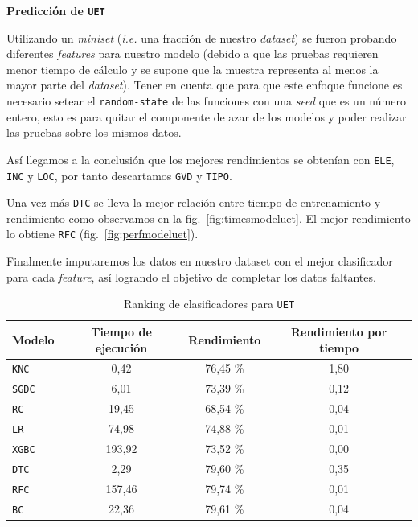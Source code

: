 \documentclass[a4paper,12pt]{article}
\begin{document}
\textbf{Predicción de \texttt{UET}}

Utilizando un \textit{miniset} (\textit{i.e.} una fracción de nuestro \textit{dataset}) se fueron probando diferentes \textit{features} para nuestro modelo (debido a que las pruebas requieren menor tiempo de cálculo y se supone que la muestra representa al menos la mayor parte del \textit{dataset}). Tener en cuenta que para que este enfoque funcione es necesario setear el \texttt{random-state} de las funciones con una \textit{seed} que es un número entero, esto es para quitar el componente de azar de los modelos y poder realizar las pruebas sobre los mismos datos.

Así llegamos a la conclusión que los mejores rendimientos se obtenían con \texttt{ELE}, \texttt{INC} y \texttt{LOC}, por tanto descartamos \texttt{GVD} y \texttt{TIPO}.

Una vez más \texttt{DTC} se lleva la mejor relación entre tiempo de entrenamiento y rendimiento como observamos en la fig.~\ref{fig:timesmodeluet}. El mejor rendimiento lo obtiene \texttt{RFC} (fig.~\ref{fig:perfmodeluet}).

Finalmente imputaremos los datos en nuestro dataset con el mejor clasificador para cada \textit{feature}, así logrando el objetivo de completar los datos faltantes.

\begin{table}[H]
\centering
\begin{tabular}{lccc}
\textbf{Modelo} & \textbf{Tiempo de ejecución} & \textbf{Rendimiento} & \textbf{Rendimiento por tiempo} \\ \hline
\texttt{KNC}  & 0,42   & 76,45 \% & 1,80 \\
\texttt{SGDC} & 6,01   & 73,39 \% & 0,12 \\
\texttt{RC}   & 19,45  & 68,54 \% & 0,04 \\
\texttt{LR}   & 74,98  & 74,88 \% & 0,01 \\
\texttt{XGBC} & 193,92 & 73,52 \% & 0,00 \\
\texttt{DTC}  & 2,29   & 79,60 \% & 0,35 \\
\texttt{RFC}  & 157,46 & 79,74 \% & 0,01 \\
\texttt{BC}   & 22,36  & 79,61 \% & 0,04
\end{tabular}
\caption{Ranking de clasificadores para \texttt{UET}}
\label{tab:ranking-uet-table}
\end{table}
\end{document}
